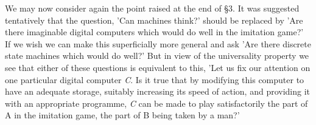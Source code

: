     We may now consider again the point raised at the end of \S 3. It was suggested tentatively that the question, 'Can machines think?' should be replaced by 'Are there imaginable digital computers which would do well in the imitation game?' If we wish we can make this superficially more general and ask 'Are there discrete state machines which would do well?' But in view of the universality property we see that either of these questions is equivalent to this, 'Let us fix our attention on one particular digital computer \textit{C}. Is it true that by modifying this computer to have an adequate storage, suitably increasing its speed of action, and providing it with an appropriate programme, \textit{C} can be made to play satisfactorily the part of A in the imitation game, the part of B being taken by a man?'